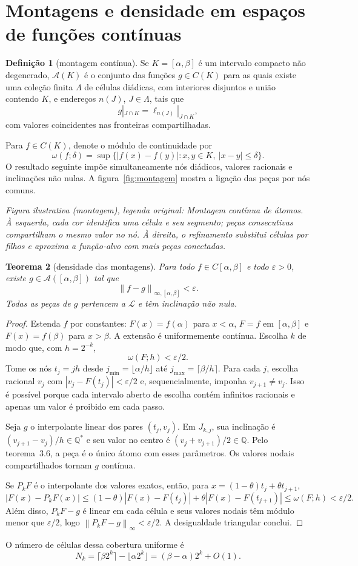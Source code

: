 \documentclass[11pt,a4paper]{article}
\theoremstyle{preciso}
\newtheorem{teorema}{Teorema}[section]
\theoremstyle{definition}
\newtheorem{definicao}[teorema]{Definição}
\newcommand{\Q}{\mathbb Q}
\newcommand{\LL}{\mathcal L}
\newcommand{\Asm}{\mathcal A}
\newcommand{\norm}[1]{\left\|#1\right\|_{\infty}}
\newcommand{\normK}[2]{\left\|#1\right\|_{\infty,#2}}
\newcommand{\eqn}[2]{\begin{equation}\label{eq:#1}#2\end{equation}}
\newcommand{\figura}[4]{\par\noindent\textit{Figura ilustrativa (#4), legenda original: #3}\par}
\begin{document}
\section{Montagens e densidade em espaços de funções contínuas}
\begin{definicao}[montagem contínua]
Se $K=[\alpha,\beta]$ é um intervalo compacto não degenerado, $\Asm(K)$ é o conjunto das funções $g\in C(K)$ para as quais existe uma coleção finita $\Lambda$ de células diádicas, com interiores disjuntos e união contendo $K$, e endereços $n(J)$, $J\in\Lambda$, tais que
\eqn{20}{g|_{J\cap K}=\ell_{n(J)}|_{J\cap K},}
com valores coincidentes nas fronteiras compartilhadas.
\end{definicao}
Para $f\in C(K)$, denote o módulo de continuidade por
\eqn{21}{\omega(f;\delta)=\sup\{|f(x)-f(y)|:x,y\in K,\ |x-y|\le\delta\}.}
O resultado seguinte impõe simultaneamente nós diádicos, valores racionais e inclinações não nulas. A figura~\ref{fig:montagem} mostra a ligação das peças por nós comuns.
\figura{03_montagem_continua}{1}{Montagem contínua de átomos. À esquerda, cada cor identifica uma célula e seu segmento; peças consecutivas compartilham o mesmo valor no nó. À direita, o refinamento substitui células por filhos e aproxima a função-alvo com mais peças conectadas.}{montagem}

\begin{teorema}[densidade das montagens]
Para todo $f\in C[\alpha,\beta]$ e todo $\varepsilon>0$, existe $g\in\Asm([\alpha,\beta])$ tal que
\[
\normK{f-g}{[\alpha,\beta]}<\varepsilon.
\]
Todas as peças de $g$ pertencem a $\LL$ e têm inclinação não nula.
\end{teorema}
\begin{proof}
Estenda $f$ por constantes: $F(x)=f(\alpha)$ para $x<\alpha$, $F=f$ em $[\alpha,\beta]$ e $F(x)=f(\beta)$ para $x>\beta$. A extensão é uniformemente contínua. Escolha $k$ de modo que, com $h=2^{-k}$,
\eqn{22}{\omega(F;h)<\varepsilon/2.}
Tome os nós $t_j=jh$ desde $j_{\min}=\lfloor\alpha/h\rfloor$ até $j_{\max}=\lceil\beta/h\rceil$. Para cada $j$, escolha racional $v_j$ com $|v_j-F(t_j)|<\varepsilon/2$ e, sequencialmente, imponha $v_{j+1}\ne v_j$. Isso é possível porque cada intervalo aberto de escolha contém infinitos racionais e apenas um valor é proibido em cada passo.

Seja $g$ o interpolante linear dos pares $(t_j,v_j)$. Em $J_{k,j}$, sua inclinação é $(v_{j+1}-v_j)/h\in\Q^*$ e seu valor no centro é $(v_j+v_{j+1})/2\in\Q$. Pelo teorema~3.6, a peça é o único átomo com esses parâmetros. Os valores nodais compartilhados tornam $g$ contínua.

Se $P_kF$ é o interpolante dos valores exatos, então, para $x=(1-\theta)t_j+\theta t_{j+1}$,
\[
|F(x)-P_kF(x)|\le(1-\theta)|F(x)-F(t_j)|+\theta|F(x)-F(t_{j+1})|
\le\omega(F;h)<\varepsilon/2.
\]
Além disso, $P_kF-g$ é linear em cada célula e seus valores nodais têm módulo menor que $\varepsilon/2$, logo $\norm{P_kF-g}<\varepsilon/2$. A desigualdade triangular conclui.
\end{proof}
O número de células dessa cobertura uniforme é
\eqn{23}{N_k=\lceil\beta2^k\rceil-\lfloor\alpha2^k\rfloor=(\beta-\alpha)2^k+O(1).}
\end{document}
